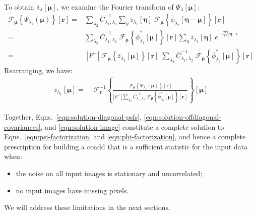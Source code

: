 \documentclass[DM,authoryear,toc]{lsstdoc}
\begin{document}
To obtain $\bar{z}_{\lambda}[\bm{\mu}]$, we examine the Fourier transform of $\Psi_{\lambda}[\bm{\mu}]$:
\begin{align}
    \mathcal{F}_{\bm{\mu}}\!\left\{
        \Psi_{\lambda_1}(\bm{\mu})
    \right\}\!\left[
        \bm{r}
    \right]
    = &
        \sum_{\lambda_2}
        \bar{C}_{\lambda_1,\lambda_2}^{-1}
        \sum_{\eta}
        \bar{z}_{\lambda_1}[\bm{\eta}]
        \;
        \mathcal{F}_{\bm{\mu}}\!\left\{
            \bar{\phi}_{\lambda_2}[\bm{\eta}-\bm{\mu}]
        \right\}\!\left[
            \bm{r}
        \right]
    \\
    = &
        \sum_{\lambda_2}
        \bar{C}_{\lambda_1,\lambda_2}^{-1}
        \;
        \mathcal{F}_{\bm{\mu}}\!\left\{
            \bar{\phi}^*_{\lambda_2}[\bm{\mu}]
        \right\}\!\left[
            \bm{r}
        \right]
        \sum_{\eta}
        \bar{z}_{\lambda_1}[\bm{\eta}]
        \;
        e^{-\frac{2\pi i}{|F^+|} \bm{\eta}\cdot\bm{r}}
    \\
    = & \;
        |F^+|
        \;
        \mathcal{F}_{\bm{\mu}}\!\left\{
            \bar{z}_{\lambda_1}[\bm{\mu}]
        \right\}\!\left[
            \bm{r}
        \right]
        \;
        \sum_{\lambda_2}
        \bar{C}_{\lambda_1,\lambda_2}^{-1}
        \;
        \mathcal{F}_{\bm{\mu}}\!\left\{
            \bar{\phi}^*_{\lambda_2}[\bm{\mu}]
        \right\}\!\left[
            \bm{r}
        \right]
\end{align}
Rearranging, we have:
\begin{align}
    \bar{z}_{\lambda_1}[\bm{\mu}]
    =&\;
    \mathcal{F}^{-1}_{\bm{r}}\!\left\{
        \frac{
            \mathcal{F}_{\bm{\mu}}\!\left\{
                \Psi_{\lambda_1}(\bm{\mu})
            \right\}\!\left[
                \bm{r}
            \right]
        }{
            |F^+|
            \sum\limits_{\lambda_2}
            \bar{C}_{\lambda_1,\lambda_2}^{-1}
            \;
            \mathcal{F}_{\bm{\mu}}\!\left\{
                \bar{\phi}^*_{\lambda_2}[\bm{\mu}]
            \right\}\!\left[
                \bm{r}
            \right]
        }
        \right\}\!\left[
        \bm{\mu}
    \right]
    \label{eqn:solution-image}
\end{align}

Together, Eqns.~\ref{eqn:solution-diagonal-psfs}, \ref{eqn:solution-offdiagonal-covariances}, and \ref{eqn:solution-image} constitute a complete solution to Eqns.~\ref{eqn:psi-factorization} and \ref{eqn:phi-factorization}, and hence a complete prescription for building a coadd that is a sufficient statistic for the input data when:
\begin{itemize}
    \item the noise on all input images is stationary and uncorrelated;
    \item no input images have missing pixels.
\end{itemize}
We will address these limitations in the next sections.
\end{document}
